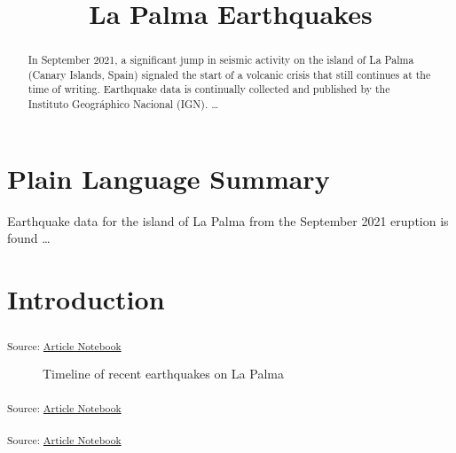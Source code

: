 \documentclass[
]{agujournal2019}
\begin{document}
\title{La Palma Earthquakes}



\begin{abstract}
In September 2021, a significant jump in seismic activity on the island
of La Palma (Canary Islands, Spain) signaled the start of a volcanic
crisis that still continues at the time of writing. Earthquake data is
continually collected and published by the Instituto Geográphico
Nacional (IGN). \ldots{}
\end{abstract}

\section*{Plain Language Summary}
Earthquake data for the island of La Palma from the September 2021
eruption is found \ldots{}




\section{Introduction}\label{introduction}

\textsubscript{Source:
\href{https://soobaki.github.io/manuscript-tutorial/index.qmd.html}{Article
Notebook}}

\label{cell-fig-timeline}
\begin{figure}[H]


\caption{\label{fig-timeline}Timeline of recent earthquakes on La Palma}

\end{figure}%

\textsubscript{Source:
\href{https://soobaki.github.io/manuscript-tutorial/index.qmd.html}{Article
Notebook}}

\textsubscript{Source:
\href{https://soobaki.github.io/manuscript-tutorial/index.qmd.html}{Article
Notebook}}
\end{document}
